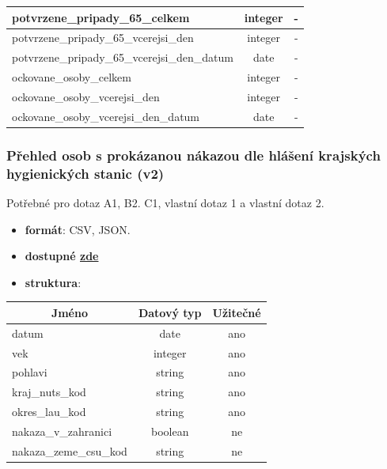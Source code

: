 \documentclass[12pt]{article}
\begin{document}
\begin{center}
\begin{tabular}{ |l|c|c| }
                \hline
                potvrzene\_pripady\_65\_celkem & integer & - \\ 
                \hline
                potvrzene\_pripady\_65\_vcerejsi\_den & integer & - \\ 
                \hline
                potvrzene\_pripady\_65\_vcerejsi\_den\_datum & date & - \\ 
                \hline
                ockovane\_osoby\_celkem & integer & - \\ 
                \hline
                ockovane\_osoby\_vcerejsi\_den & integer & - \\ 
                \hline
                ockovane\_osoby\_vcerejsi\_den\_datum & date & - \\ 
                \hline
            \end{tabular}
        \end{center}

\subsubsection*{Přehled osob s prokázanou nákazou dle hlášení krajských hygienických stanic (v2)}
Potřebné pro dotaz A1, B2. C1, vlastní dotaz 1 a vlastní dotaz 2.
\begin{itemize}
    \item \textbf{formát}: CSV, JSON.
    \item \textbf{dostupné  \href{https://onemocneni-aktualne.mzcr.cz/api/v2/covid-19/osoby.csv}{zde}}
    \item \textbf{struktura}:
\end{itemize}
        \begin{center}
            \begin{tabular}{ |l|c|c| } 
                \hline
                \multicolumn{1}{|c|}{Jméno} & Datový typ & Užitečné \\
                \hline
                \hline
                datum & date & ano \\ 
                \hline
                vek & integer & ano \\ 
                \hline
                pohlavi & string & ano \\ 
                \hline
                kraj\_nuts\_kod & string & ano \\ 
                \hline
                okres\_lau\_kod & string & ano \\ 
                \hline
                nakaza\_v\_zahranici & boolean & ne \\ 
                \hline
                nakaza\_zeme\_csu\_kod & string & ne \\ 
                \hline
            \end{tabular}
        \end{center}
        
\end{document}
